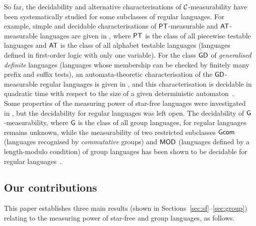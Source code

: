 So far, the decidability and alternative characterisations of \({\cal C}\)-measurability have been systematically studied for some subclasses of regular languages.
For example, simple and decidable characterisations of \(\mathsf{PT}\)-measurable and \(\mathsf{AT}\)-measurable languages are given in \cite{ltmeasure}, where \(\mathsf{PT}\) is the class of all piecewise testable languages and \(\mathsf{AT}\) is the class of all alphabet testable languages (\ie languages defined in first-order logic with only one variable).
For the class \(\mathsf{GD}\) of \emph{generalised definite} languages (\ie languages whose membership can be checked by finitely many prefix and suffix tests), an automata-theoretic characterisation of the \(\mathsf{GD}\)-measurable regular languages is given in \cite{gdmeasure}, and this characterisation is decidable in quadratic time with respect to the size of a given deterministic automaton~\cite{ppl2024}.
Some properties of the measuring power of star-free languages were investigated in \cite{carathe}, but the decidability for regular languages was left open.
The decidability of \(\mathsf{G}\)-measurability, where \(\mathsf{G}\) is the class of all group languages, for regular languages remains unknown, while the measurability of two restricted subclasses
 \(\mathsf{Gcom}\) (languages recognised by \emph{commutative} groups) and \(\mathsf{MOD}\) (languages defined by a length-modulo condition) of group languages has been shown to be decidable for regular languages~\cite{gcommeasure}. 

\subsection*{Our contributions}
This paper establishes three main results (shown in Sections~\ref{sec:sf}--\ref{sec:group}) relating to the measuring power of star-free and group languages, as follows.

